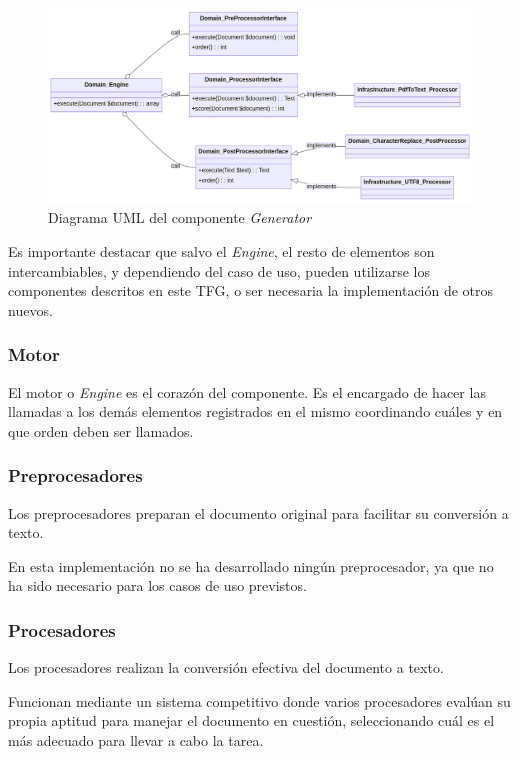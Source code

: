 \begin{figure}[ht]
    \begin{center}
        \includegraphics[width=\textwidth]{./chapter/4/images/chapter_4.generator_component_uml}
        \caption{Diagrama UML del componente \textit{Generator}}
        \label{fig:chapter_4.generator_component_uml}
    \end{center}
\end{figure}

Es importante destacar que salvo el \textit{Engine}, el resto de elementos son intercambiables, y dependiendo del caso
de uso, pueden utilizarse los componentes descritos en este TFG, o ser necesaria la implementación de otros nuevos.

\subsubsection*{Motor}
El motor o \textit{Engine} es el corazón del componente.
Es el encargado de hacer las llamadas a los demás elementos registrados en el mismo coordinando cuáles y en que
orden deben ser llamados.

\subsubsection*{Preprocesadores}
Los preprocesadores preparan el documento original para facilitar su conversión a texto.

En esta implementación no se ha desarrollado ningún preprocesador, ya que no ha sido necesario para los casos de uso
previstos.

\subsubsection*{Procesadores}
Los procesadores realizan la conversión efectiva del documento a texto.

Funcionan mediante un sistema competitivo donde varios procesadores evalúan su propia aptitud para manejar el documento
en cuestión, seleccionando cuál es el más adecuado para llevar a cabo la tarea.


